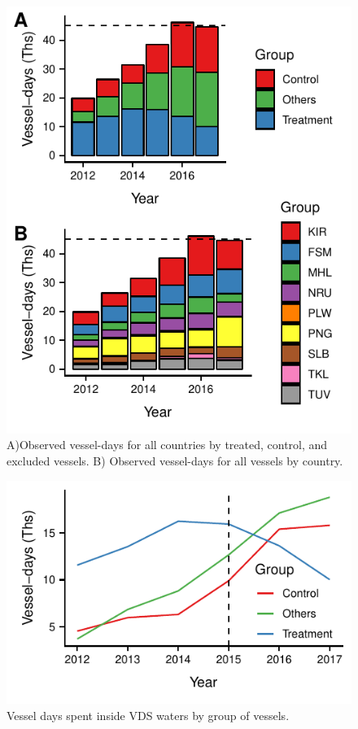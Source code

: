 \documentclass[9p,twocolumn,twoside,lineno]{pnas-new}
\begin{document}
\begin{figure}
\centering
	\includegraphics{img/all_PS_VDS_cty_year.pdf}
	\caption{\label{fig:VDS_country_year}A)Observed vessel-days for all countries by treated, control, and excluded vessels. B) Observed vessel-days for all vessels by country.}
\end{figure}

\begin{figure}
\centering
	\includegraphics{img/included_PS_VDS_year_DiD.pdf}
	\caption{\label{fig:included_PS_VDS_year_DiD}Vessel days spent inside VDS waters by group of vessels.}
\end{figure}
\end{document}
